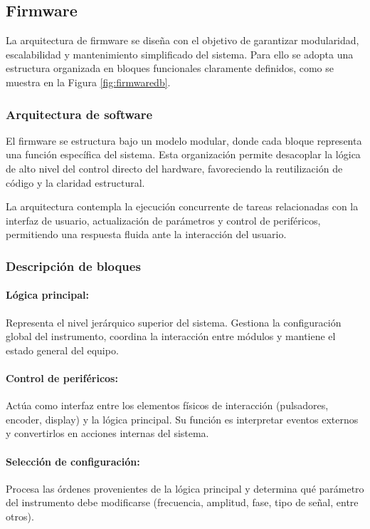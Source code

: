\subsection{Firmware}

La arquitectura de firmware se diseña con el objetivo de garantizar modularidad, escalabilidad y mantenimiento simplificado del sistema. Para ello se adopta una estructura organizada en bloques funcionales claramente definidos, como se muestra en la Figura \ref{fig:firmwaredb}.

\subsubsection{Arquitectura de software}

El firmware se estructura bajo un modelo modular, donde cada bloque representa una función específica del sistema. Esta organización permite desacoplar la lógica de alto nivel del control directo del hardware, favoreciendo la reutilización de código y la claridad estructural.

La arquitectura contempla la ejecución concurrente de tareas relacionadas con la interfaz de usuario, actualización de parámetros y control de periféricos, permitiendo una respuesta fluida ante la interacción del usuario.

\subsubsection{Descripción de bloques}

\paragraph{Lógica principal:}
Representa el nivel jerárquico superior del sistema. Gestiona la configuración global del instrumento, coordina la interacción entre módulos y mantiene el estado general del equipo.

\paragraph{Control de periféricos:}
Actúa como interfaz entre los elementos físicos de interacción (pulsadores, encoder, display) y la lógica principal. Su función es interpretar eventos externos y convertirlos en acciones internas del sistema.

\paragraph{Selección de configuración:}
Procesa las órdenes provenientes de la lógica principal y determina qué parámetro del instrumento debe modificarse (frecuencia, amplitud, fase, tipo de señal, entre otros).

